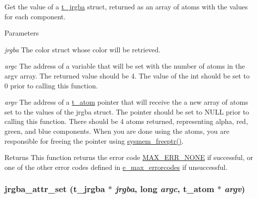 Get the value of a \hyperlink{structt__jrgba}{t\_\-jrgba} struct, returned as an array of atoms with the values for each component. 
\begin{DoxyParams}{Parameters}
\item[{\em jrgba}]The color struct whose color will be retrieved. \item[{\em argc}]The address of a variable that will be set with the number of atoms in the argv array. The returned value should be 4. The value of the int should be set to 0 prior to calling this function. \item[{\em argv}]The address of a \hyperlink{structt__atom}{t\_\-atom} pointer that will receive the a new array of atoms set to the values of the jrgba struct. The pointer should be set to NULL prior to calling this function. There should be 4 atoms returned, representing alpha, red, green, and blue components. When you are done using the atoms, you are responsible for freeing the pointer using \hyperlink{group__memory_ga200c82639e547869db1f3887d17102d3}{sysmem\_\-freeptr()}. \end{DoxyParams}
\begin{DoxyReturn}{Returns}
This function returns the error code \hyperlink{group__misc_gga0764dd6c02b76cca7d053ae50555d69da6d22f77fef8b1e1b074cef5d29d935fd}{MAX\_\-ERR\_\-NONE} if successful, or one of the other error codes defined in \hyperlink{group__misc_ga0764dd6c02b76cca7d053ae50555d69d}{e\_\-max\_\-errorcodes} if unsuccessful. 
\end{DoxyReturn}
\hypertarget{group__color_ga22c35beb59c7430d6c6e25e6e1fdb8c9}{
\subsubsection[{jrgba\_\-attr\_\-set}]{ jrgba\_\-attr\_\-set ({\bf t\_\-jrgba} $\ast$ {\em jrgba}, \/  long {\em argc}, \/  {\bf t\_\-atom} $\ast$ {\em argv})}}
\label{group__color_ga22c35beb59c7430d6c6e25e6e1fdb8c9}


